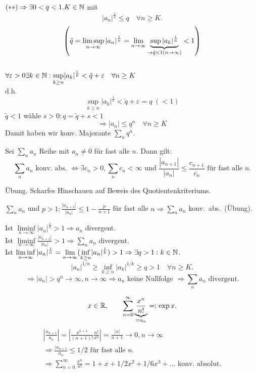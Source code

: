\documentclass[../ana1.tex]{subfiles}
\begin{document}
\begin{bew}
	\( (**) \Rightarrow \exists 0<q<1. K\in\mathbb{N} \) mit \[ |a_n|^{\frac{1}{n}} \leq q \quad\forall n\geq K. \]
	\[\left(\tilde{q} = \limsup\limits_{n\rightarrow\infty} |a_n|^{\frac{1}{n}} = \lim\limits_{n\rightarrow\infty} \underbrace{\sup |a_k|^{\frac{1}{n}}}_{\rightarrow \tilde{q} < 1 (n \rightarrow \infty)}< 1\right)\] \\
	\(\forall \varepsilon > 0 \exists k \in \mathbb{N}: \underset{k \geq n}{\sup} |a_k|^{\frac{1}{k}} < \tilde{q} + \varepsilon \quad \forall n \geq K \) \\
	d.h.\\
	\[\underset{k \geq n}{\sup} |a_k|^{\frac{1}{k}} < \tilde{q} + \varepsilon = q \; (< 1)\]
	\(\tilde{q} < 1\) wähle \(s > 0: q = \tilde{q} + s < 1\) \\
	\[\Rightarrow |a_n| \leq q^n \quad \forall n \geq K \]
	Damit haben wir konv. Majorante \( \sum_n q^n \).
\end{bew}
\begin{satz}
	Sei \( \sum_n a_n \) Reihe mit \(a_n \neq 0 \) für fast alle \(n\). Dann gilt:
	\[ \sum_n a_n \text{ konv.\ abs.\ } \Leftrightarrow \exists c_n > 0, \sum_n c_n < \infty \text{ und } \frac{|a_{n+1}|}{|a_n|} \leq \frac{c_{n+1}}{c_n} \text{ für fast alle }n. \]
\end{satz}
\begin{bew}Übung.
	Scharfes Hinschauen auf Beweis des Quotientenkriteriums.
\end{bew}
\begin{kor}
	\( \sum_n a_n \) und \( p>1: \frac{|a_{n+1}|}{|a_n|} \leq 1 - \frac{p}{n+1} \) für fast alle \(n \Rightarrow \sum_n a_n \) konv.\ abs.\ (Übung).
\end{kor}
\begin{bem}
	Ist \( \liminf\limits_{n\rightarrow\infty} |a_n|^{\frac{1}{n}} > 1 \Rightarrow a_n \) divergent.\\
	Ist \( \liminf\limits_{n\rightarrow\infty} \frac{|a_{n+1}|}{|a_n|} > 1 \Rightarrow \sum_n a_n \) divergent.\\
	Ist \( \liminf\limits_{n\rightarrow\infty} |a_n|^{\frac{1}{n}} = \lim\limits_{n\rightarrow\infty}(\underset{k\geq n}{\inf} |a_n|^{\frac{1}{k}}) > 1 \Rightarrow \exists q>1: k \in\mathbb{N} \).
	\[ |a_n|^{1/n} \geq \underset{k\geq n}{\inf} |a_k|^{1/k} \geq q > 1 \quad\forall n\geq K. \]
	\[ \Rightarrow |a_n| > q^n \rightarrow \infty, n\rightarrow\infty \Rightarrow a_n \text{ keine Nullfolge } \Rightarrow \sum_n a_n \text{ divergent}. \]
\end{bem}
\begin{bsp}[Exponentialreihe]
	\[ x\in\mathbb{R},\qquad \sum_{n=0}^{\infty} \underbrace{\frac{x^n}{n!}}_{=a_n} =: \exp x. \]
	\begin{align*}
		|\frac{a_{n+1}}{a_n}| = |\frac{x^{n+1}}{(n+1)!} \frac{n!}{x^n}| = \frac{|x|}{n+1} \rightarrow 0, n\rightarrow\infty \\
		\Rightarrow \frac{|a_{n+1}}{a_n} \leq 1/2 \text{ für fast alle } n.\\
		\Rightarrow \sum_{n=0}^{\infty} \frac{x^n}{n!} = 1 + x + 1/2 x^2 + 1/6 x^3 + \dots \text{ konv.\ absolut.}
	\end{align*}
\end{bsp}
\end{document}
